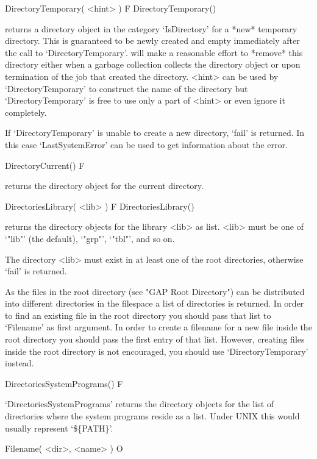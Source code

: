 \>DirectoryTemporary( <hint> ) F
\)DirectoryTemporary()

returns  a directory  object in the   category `IsDirectory' for a  *new*
temporary directory.   This is guaranteed to  be  newly created and empty
immediately  after the call to `DirectoryTemporary'.   {\GAP} will make a
reasonable effort   to *remove* this   directory  either  when a  garbage
collection  collects the directory   object  or upon termination  of  the
{\GAP}   job that   created  the  directory.     <hint> can  be  used  by
`DirectoryTemporary' to construct    the  name  of the    directory   but
`DirectoryTemporary' is free to use only a  part of <hint> or even ignore
it completely.

If `DirectoryTemporary' is  unable to create a  new  directory, `fail' is
returned.  In this case `LastSystemError' can be  used to get information
about the error.

\>DirectoryCurrent() F

returns the directory object for the current directory.

\>DirectoriesLibrary( <lib> ) F
\)DirectoriesLibrary()

returns the  directory objects  for  the  {\GAP}  library <lib>  as list.
<lib> must be one of `"lib"' (the default), `"grp"', `"tbl"', and so on.

The directory <lib> must exist in at  least one of the root directories,
otherwise `fail' is returned.

As the files in the {\GAP} root  directory (see "GAP Root Directory") can
be  distributed  into different  directories in the  filespace  a list of
directories is returned.  In order to find an existing file in the {\GAP}
root directory you should pass that list to `Filename' as first argument.
In order to  create  a filename  for a  new file inside the  {\GAP}  root
directory you   should pass  the first  entry    of that list.   However,
creating files  inside the {\GAP} root  directory is not  encouraged, you
should use `DirectoryTemporary' instead.

\>DirectoriesSystemPrograms() F

`DirectoriesSystemPrograms' returns the directory objects for the list of
directories where  the system programs reside as a list.  Under UNIX this
would usually represent `\$\{PATH\}'.


\>Filename( <dir>, <name> ) O

